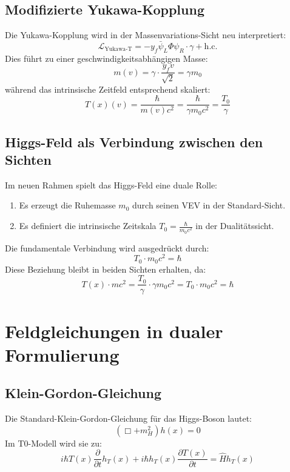 \documentclass[a4paper,12pt]{article}
\newcommand{\Tfield}{T(x)}
\begin{document}
	\subsection{Modifizierte Yukawa-Kopplung}
	Die Yukawa-Kopplung wird in der Massenvariations-Sicht neu interpretiert:
	\begin{equation}
		\mathcal{L}_{\text{Yukawa-T}} = -y_f \bar{\psi}_L \Phi \psi_R \cdot \gamma + \text{h.c.}
	\end{equation}
	Dies führt zu einer geschwindigkeitsabhängigen Masse:
	\begin{equation}
		m(v) = \gamma \cdot \frac{y_f v}{\sqrt{2}} = \gamma m_0
	\end{equation}
	während das intrinsische Zeitfeld entsprechend skaliert:
	\begin{equation}
		\Tfield(v) = \frac{\hbar}{m(v)c^2} = \frac{\hbar}{\gamma m_0 c^2} = \frac{T_0}{\gamma}
	\end{equation}
	
	\subsection{Higgs-Feld als Verbindung zwischen den Sichten}
	Im neuen Rahmen spielt das Higgs-Feld eine duale Rolle:
	\begin{enumerate}
		\item Es erzeugt die Ruhemasse \( m_0 \) durch seinen VEV in der Standard-Sicht.
		\item Es definiert die intrinsische Zeitskala \( T_0 = \frac{\hbar}{m_0 c^2} \) in der Dualitätssicht.
	\end{enumerate}
	Die fundamentale Verbindung wird ausgedrückt durch:
	\begin{equation}
		T_0 \cdot m_0 c^2 = \hbar
	\end{equation}
	Diese Beziehung bleibt in beiden Sichten erhalten, da:
	\begin{equation}
		\Tfield \cdot m c^2 = \frac{T_0}{\gamma} \cdot \gamma m_0 c^2 = T_0 \cdot m_0 c^2 = \hbar
	\end{equation}
	
	\section{Feldgleichungen in dualer Formulierung}
	\subsection{Klein-Gordon-Gleichung}
	Die Standard-Klein-Gordon-Gleichung für das Higgs-Boson lautet:
	\begin{equation}
		(\Box + m_H^2) h(x) = 0
	\end{equation}
	Im T0-Modell wird sie zu:
	\begin{equation}
		i\hbar \Tfield \frac{\partial}{\partial t} h_T(x) + i\hbar h_T(x) \frac{\partial \Tfield}{\partial t} = \hat{H} h_T(x)
	\end{equation}
	
\end{document}
